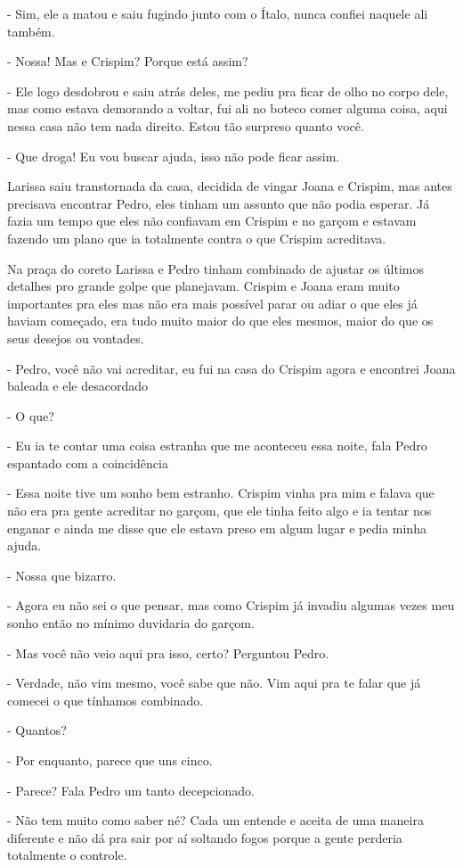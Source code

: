 - Sim, ele a matou e saiu fugindo junto com o Ítalo, nunca confiei naquele ali também.

- Nossa! Mas e Crispim? Porque está assim?

- Ele logo desdobrou e saiu atrás deles, me pediu pra ficar de olho no corpo dele, mas como estava demorando a voltar, fui ali no boteco comer alguma coisa, aqui nessa casa não tem nada direito. Estou tão surpreso quanto você.

- Que droga! Eu vou buscar ajuda, isso não pode ficar assim.

Larissa saiu transtornada da casa, decidida de vingar Joana e Crispim, mas antes precisava encontrar Pedro, eles tinham um assunto que não podia esperar. Já fazia um tempo que eles não confiavam em Crispim e no garçom e estavam fazendo um plano que ia totalmente contra o que Crispim acreditava.

Na praça do coreto Larissa e Pedro tinham combinado de ajustar os últimos detalhes pro grande golpe que planejavam. Crispim e Joana eram muito importantes pra eles mas não era mais possível parar ou adiar o que eles já haviam começado, era tudo muito maior do que eles mesmos, maior do que os seus desejos ou vontades.

- Pedro, você não vai acreditar, eu fui na casa do Crispim agora e encontrei Joana baleada e ele desacordado

- O que?

- Eu ia te contar uma coisa estranha que me aconteceu essa noite, fala Pedro espantado com a coincidência

- Essa noite tive um sonho bem estranho. Crispim vinha pra mim e falava que não era pra gente acreditar no garçom, que ele tinha feito algo e ia tentar nos enganar e ainda me disse que ele estava preso em algum lugar e pedia minha ajuda.

- Nossa que bizarro.

- Agora eu não sei o que pensar, mas como Crispim já invadiu algumas vezes meu sonho então no mínimo duvidaria do garçom.

- Mas você não veio aqui pra isso, certo? Perguntou Pedro.

- Verdade, não vim mesmo, você sabe que não. Vim aqui pra te falar que já comecei o que tínhamos combinado.

- Quantos?

- Por enquanto, parece que uns cinco.

- Parece? Fala Pedro um tanto decepcionado.

- Não tem muito como saber né? Cada um entende e aceita de uma maneira diferente e não dá pra sair por aí soltando fogos porque a gente perderia totalmente o controle.

